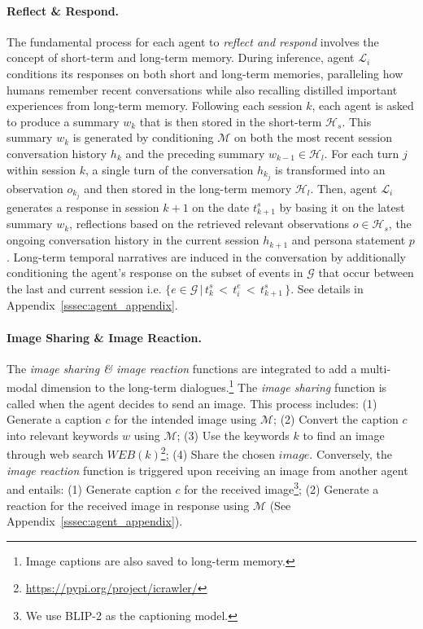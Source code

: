 \paragraph{Reflect \& Respond.}
The fundamental process for each agent to \textit{reflect and respond} involves the concept of short-term and long-term memory.
During inference, agent $\mathcal{L}_i$ conditions its responses on both short and long-term memories, paralleling how humans remember recent conversations while also recalling distilled important experiences from long-term memory. Following each session $k$, each agent is asked to produce a summary $w_k$ that is then stored in the short-term $\mathcal{H}_s$. This summary $w_k$ is generated by conditioning $\mathcal{M}$ on both the most recent session conversation history $h_{k}$ and the preceding summary $w_{k-1} \in \mathcal{H}_l$. For each turn $j$ within session $k$, a single turn of the conversation $h_{k_j}$ is transformed into an observation $o_{k_j}$ and then stored in the long-term memory $\mathcal{H}_l$. Then, agent $\mathcal{L}_i$ generates a response in session $k+1$ on the date $t_{k+1}^s$ by basing it on the latest summary $w_k$, reflections based on the retrieved relevant observations $o \in \mathcal{H}_s$, the ongoing conversation history in the current session $h_{k+1}$ and persona statement $p$. Long-term temporal narratives are induced in the conversation by additionally conditioning the agent's response on the subset of events in $\mathcal{G}$ that occur between the last and current session i.e. $\{e\in\mathcal{G}\,|\,t_{k}^s\,<\,t_{i}^e\,<\,t_{k+1}^s\,\}$. See details in Appendix~\ref{sssec:agent_appendix}.

 
\paragraph{Image Sharing \& Image Reaction.}
The \textit{image sharing \& image reaction} functions are integrated to add a multi-modal dimension to the long-term dialogues.\footnote{Image captions are also saved to long-term memory.}
The \textit{image sharing} function is called when the agent decides to send an image. This process includes:
(1) Generate a caption $c$ for the intended image using $\mathcal{M}$;
(2) Convert the caption $c$ into relevant keywords $w$ using $\mathcal{M}$;
(3) Use the keywords $k$ to find an image through web search $WEB(k)$\footnote{\url{https://pypi.org/project/icrawler/}};
(4) Share the chosen $image$.
Conversely, the \textit{image reaction} function is triggered upon receiving an image from another agent and entails:
(1) Generate caption $c$ for the received image\footnote{We use BLIP-2 \cite{li2023blip} as the captioning model.};
(2) Generate a reaction for the received image in response using $\mathcal{M}$ (See Appendix~\ref{sssec:agent_appendix}).




